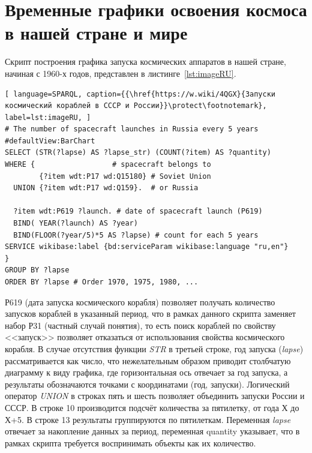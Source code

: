 \section{Временные графики освоения космоса в нашей стране и мире}
Скрипт построения графика запуска космических аппаратов в нашей стране, начиная с 1960-х годов, представлен в листинге~\ref{lst:imageRU}.
\begin{lstlisting}[ language=SPARQL, caption={{\href{https://w.wiki/4QGX}{Запуски космический кораблей в СССР и России}}\protect\footnotemark}, label=lst:imageRU, ]
# The number of spacecraft launches in Russia every 5 years
#defaultView:BarChart
SELECT (STR(?lapse) AS ?lapse_str) (COUNT(?item) AS ?quantity)
WHERE {                  # spacecraft belongs to
        {?item wdt:P17 wd:Q15180} # Soviet Union
  UNION {?item wdt:P17 wd:Q159}.  # or Russia
  
  ?item wdt:P619 ?launch. # date of spacecraft launch (P619)
  BIND( YEAR(?launch) AS ?year) 
  BIND(FLOOR(?year/5)*5 AS ?lapse) # count for each 5 years
SERVICE wikibase:label {bd:serviceParam wikibase:language "ru,en"}
} 
GROUP BY ?lapse
ORDER BY ?lapse # Order 1970, 1975, 1980, ...
\end{lstlisting}
 Р619 (дата запуска космического корабля) позволяет получать количество запусков кораблей в указанный период, что в рамках данного скрипта заменяет набор  Р31 (частный случай понятия), то есть поиск кораблей по свойству <<запуск>> позволяет отказаться от использования свойства  космического корабля. В случае отсутствия функции {\it STR} в третьей строке, год запуска ({\it lapse}) рассматривается как число, что нежелательным образом приводит столбчатую диаграмму к виду графика, где горизонтальная ось отвечает за год запуска, а результаты обозначаются точками с координатами (год, запуски). Логический оператор {\it UNION} в строках пять и шесть позволяет объединить запуски России и СССР. В строке 10 производится подсчёт количества за пятилетку, от года Х до Х+5. В строке 13 результаты группируются по пятилеткам. Переменная {\it lapse} отвечает за накопление данных за период, переменная quantity указывает, что в рамках скрипта требуется воспринимать объекты как их количество.

